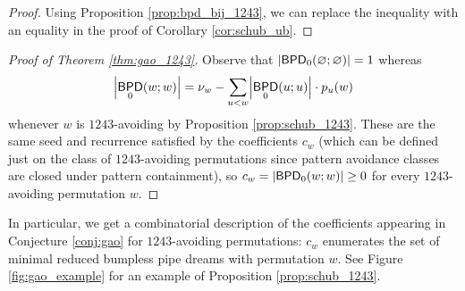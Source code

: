 \documentclass[11pt]{article}
\theoremstyle{definition}
\numberwithin{equation}{section}
\DeclarePairedDelimiter\abs{\lvert}{\rvert}
\DeclareMathOperator{\BPD}{\mathsf{BPD}}
\begin{document}
\begin{proof}
    Using Proposition \ref{prop:bpd_bij_1243}, we can replace the inequality with an equality in the proof of Corollary \ref{cor:schub_ub}.
\end{proof}

\begin{proof}[Proof of Theorem \ref{thm:gao_1243}]
Observe that $\abs*{\BPD_0(\varnothing;\varnothing)} = 1$ whereas \[
    \abs*{\BPD_0(w;w)}
    = \nu_w - \sum_{u<w} \abs*{\BPD_0(u;u)}\cdot p_u(w)
\] whenever $w$ is $1243$-avoiding by Proposition \ref{prop:schub_1243}.
These are the same seed and recurrence satisfied by the coefficients $c_w$ (which can be defined just on the class of $1243$-avoiding permutations since pattern avoidance classes are closed under pattern containment), so $c_w = \abs*{\BPD_0(w;w)} \geq 0$ for every $1243$-avoiding permutation $w$.
\end{proof}

In particular, we get a combinatorial description of the coefficients appearing in Conjecture \ref{conj:gao} for $1243$-avoiding permutations:
$c_w$ enumerates the set of minimal reduced bumpless pipe dreams with permutation $w$.
See Figure \ref{fig:gao_example} for an example of Proposition \ref{prop:schub_1243}.
\end{document}
